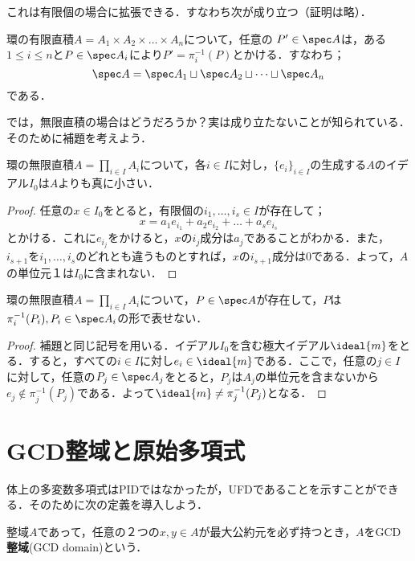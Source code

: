これは有限個の場合に拡張できる．すなわち次が成り立つ（証明は略）．

\begin{prop}
	環の有限直積$A=A_1\times A_2\times\dots\times A_n$について，任意の $P'\in\spec A$は，ある$1\leq i\leq n$と$P\in\spec A_i$により$P'=\pi_i^{-1}(P)$とかける．すなわち；
	\[\spec A=\spec A_1\sqcup\spec A_2\sqcup\dots\sqcup\spec A_n\]
	である．
\end{prop}

では，無限直積の場合はどうだろうか？実は成り立たないことが知られている．そのために補題を考えよう．

\begin{lem}
	環の無限直積$A=\prod_{i\in I}A_i$について，各$i\in I$に対し，$\{e_i\}_{i\in I}$の生成する$A$のイデアル$I_0$は$A$よりも真に小さい．
\end{lem}

\begin{proof}
	任意の$x\in I_0$をとると，有限個の$i_1,\dots,i_s\in I$が存在して；
	\[x=a_1e_{i_1}+a_2e_{i_2}+\dots+a_se_{i_s}\]
	とかける．これに$e_{i_j}$をかけると，$x$の$i_j$成分は$a_j$であることがわかる．また，$i_{s+1}$を$i_1,\dots,i_s$のどれとも違うものとすれば，$x$の$i_{s+1}$成分は0である．よって，$A$の単位元$１$は$I_0$に含まれない．
\end{proof}

\begin{prop}
	環の無限直積$A=\prod_{i\in I}A_i$について，$P\in\spec A$が存在して，$P$は$\pi^{-1}_i(P_i),P_i\in\spec A_i$の形で表せない．
\end{prop}

\begin{proof}
	補題と同じ記号を用いる．イデアル$I_0$を含む極大イデアル$\ideal{m}$をとる．すると，すべての$i\in I$に対し$e_i\in\ideal{m}$である．ここで，任意の$j\in I$に対して，任意の$P_j\in\spec A_j$をとると，$P_j$は$A_j$の単位元を含まないから$e_j\not\in\pi^{-1}_j(P_j)$である．よって$\ideal{m}\neq\pi_j^{-1}(P_j)$となる．
\end{proof}

\section{GCD整域と原始多項式}
体上の多変数多項式はPIDではなかったが，UFDであることを示すことができる．そのために次の定義を導入しよう．

\begin{defi}[GCD整域]\label{defi:GCDdomain}
	整域$A$であって，任意の２つの$x,y\in A$が最大公約元を必ず持つとき，$A$をGCD\textbf{整域}(GCD domain)という．
\end{defi}


